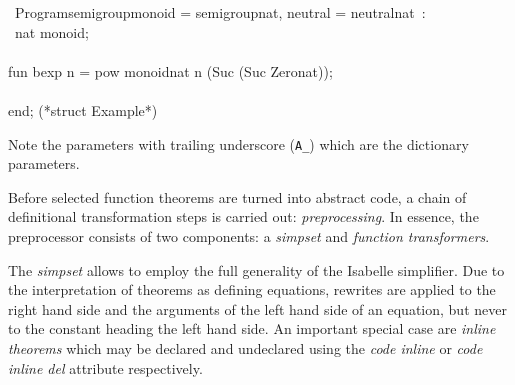 \begin{isabellebody}
\begin{isamarkuptext}
\hspace*{0pt} ~{}Program{}{}semigroup{}monoid = semigroup{}nat, neutral = neutral{}nat{}~:\\
\hspace*{0pt} ~nat monoid;\\
\hspace*{0pt}\\
\hspace*{0pt}fun bexp n = pow monoid{}nat n (Suc (Suc Zero{}nat));\\
\hspace*{0pt}\\
\hspace*{0pt}end; (*struct Example*)%
\end{isamarkuptext}%
\isamarkuptrue%
%
\endisatagquote
{\isafoldquote}%
%
\isadelimquote
%
\endisadelimquote
%
\begin{isamarkuptext}%
\noindent Note the parameters with trailing underscore (\verb|A_|)
    which are the dictionary parameters.%
\end{isamarkuptext}%
\isamarkuptrue%
%
\isamarkuptrue%
%
\begin{isamarkuptext}%
Before selected function theorems are turned into abstract
  code, a chain of definitional transformation steps is carried
  out: \emph{preprocessing}.  In essence, the preprocessor
  consists of two components: a \emph{simpset} and \emph{function transformers}.

  The \emph{simpset} allows to employ the full generality of the Isabelle
  simplifier.  Due to the interpretation of theorems
  as defining equations, rewrites are applied to the right
  hand side and the arguments of the left hand side of an
  equation, but never to the constant heading the left hand side.
  An important special case are \emph{inline theorems} which may be
  declared and undeclared using the
  \emph{code inline} or \emph{code inline del} attribute respectively.


\end{isamarkuptext}
\end{isabellebody}
